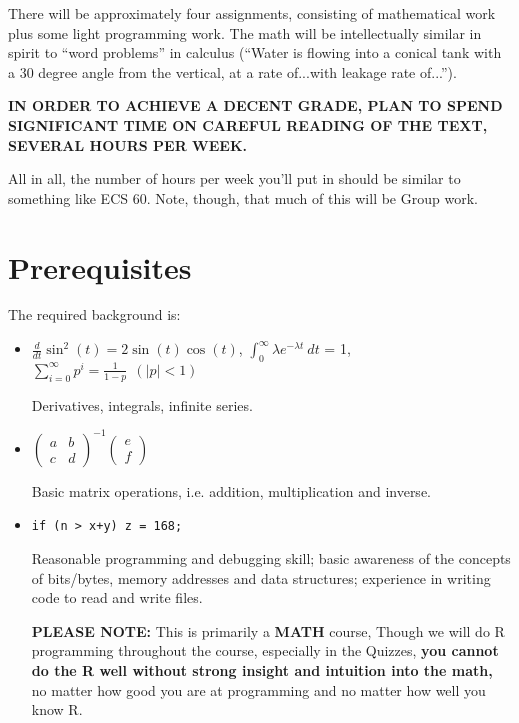 There will be approximately four assignments, consisting of mathematical
work plus some light programming work.  The math will be
intellectually similar in spirit to ``word problems'' in calculus 
(``Water is flowing into a conical tank with a 30 degree angle from the
vertical, at a rate of...with leakage rate of...'').

{\bf IN ORDER TO ACHIEVE A DECENT GRADE, PLAN TO SPEND SIGNIFICANT TIME
ON CAREFUL READING OF THE TEXT, SEVERAL HOURS PER WEEK.}

All in all, the number of hours per week you'll put in should be similar
to something like ECS 60.  Note, though, that much of this will be Group
work.

\section{Prerequisites}

The required background is:

\begin{itemize}

\item 
$\frac{d}{dt} \sin^2(t) = 2 \sin(t) \cos(t)$, 
\hspace{0.25in}
$\int_{0}^{\infty} \lambda e^{-\lambda t} ~ dt$ = 1,
\hspace{0.25in}
$\sum_{i=0}^{\infty} p^i = \frac{1}{1-p} ~~ (|p| < 1)$

Derivatives, integrals, infinite series.

\item 
$
\left (         
\begin{array}{cc}
a & b \\
c & d
\end{array}
\right )^{-1}     
\left (         
\begin{array}{c}
e \\
f
\end{array}
\right )
$

Basic matrix operations, i.e. addition, multiplication and inverse.

\item {\tt if (n > x+y) z = 168;}

Reasonable programming and debugging skill; basic awareness of the
concepts of bits/bytes, memory addresses and data structures; experience
in writing code to read and write files.

{\bf PLEASE NOTE:}  This is primarily a {\bf MATH} course,  Though we
will do R programming throughout the course, especially in the Quizzes,
{\bf you cannot do the R well without strong insight and intuition into
the math,} no matter how good you are at programming and no matter how
well you know R.  

\end{itemize}

